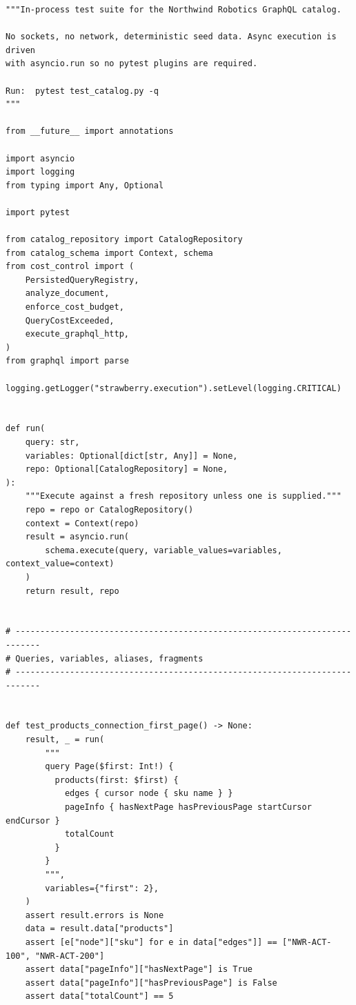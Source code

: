 \begin{verbatim}
"""In-process test suite for the Northwind Robotics GraphQL catalog.

No sockets, no network, deterministic seed data. Async execution is driven
with asyncio.run so no pytest plugins are required.

Run:  pytest test_catalog.py -q
"""

from __future__ import annotations

import asyncio
import logging
from typing import Any, Optional

import pytest

from catalog_repository import CatalogRepository
from catalog_schema import Context, schema
from cost_control import (
    PersistedQueryRegistry,
    analyze_document,
    enforce_cost_budget,
    QueryCostExceeded,
    execute_graphql_http,
)
from graphql import parse

logging.getLogger("strawberry.execution").setLevel(logging.CRITICAL)


def run(
    query: str,
    variables: Optional[dict[str, Any]] = None,
    repo: Optional[CatalogRepository] = None,
):
    """Execute against a fresh repository unless one is supplied."""
    repo = repo or CatalogRepository()
    context = Context(repo)
    result = asyncio.run(
        schema.execute(query, variable_values=variables, context_value=context)
    )
    return result, repo


# ---------------------------------------------------------------------------
# Queries, variables, aliases, fragments
# ---------------------------------------------------------------------------


def test_products_connection_first_page() -> None:
    result, _ = run(
        """
        query Page($first: Int!) {
          products(first: $first) {
            edges { cursor node { sku name } }
            pageInfo { hasNextPage hasPreviousPage startCursor endCursor }
            totalCount
          }
        }
        """,
        variables={"first": 2},
    )
    assert result.errors is None
    data = result.data["products"]
    assert [e["node"]["sku"] for e in data["edges"]] == ["NWR-ACT-100", "NWR-ACT-200"]
    assert data["pageInfo"]["hasNextPage"] is True
    assert data["pageInfo"]["hasPreviousPage"] is False
    assert data["totalCount"] == 5



\end{verbatim}
